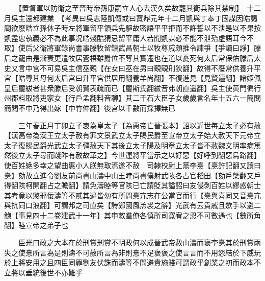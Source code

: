 　　【置督軍以防衛之至晉時帝孫康嗣立人心去漢久矣故罷其衛兵除其禁制】　十二月吳主還都建業　【考異曰吳志陸凱傳或曰寶鼎元年十二月凱與丁奉丁固謀因皓謁廟欲廢皓立孫休子時左將軍留平領兵先驅故密語平平拒而不許誓以不泄是以不果按凱盡忠執義必不為此事况皓殘酷猜忌留平庸人若聞凱謀必不能不泄殆虛語耳今不取】使后父衛將軍錄尚書事滕牧留鎮武昌朝士以牧尊戚頗推令諫爭【爭讀曰諍】滕后之寵由是漸衰更遣牧居蒼梧雖爵位不奪其實遷也在道以憂死何太后常保佑滕后太史又言中宮不可易吳主信巫覡【在女曰巫在男曰覡覡刑狄翻】故得不廢常供養升平宮【皓尊其母何太后宫曰升平宮供居用翻養羊尚翻】不復進見【見賢遍翻】諸姬佩皇后璽紱者甚衆滕后受朝賀表疏而已【璽斯氏翻紱音弗朝直遥翻】吳主使黄門徧行州郡料取將吏家女【行戶孟翻料音聊】其二千石大臣子女歲歲言名年十五六一簡閲簡閲不中乃得出嫁【中竹仲翻】後宫以千數而採擇無已

　　三年春正月丁卯立子衷為皇太子【為惠帝亡晉張本】詔以近世每立太子必有赦【漢高帝為漢王立太子赦有罪文景武立太子賜民爵至宣帝立太子始大赦天下元帝立太子復賜民爵光武立太子彊赦天下其後立太子陽及明章立太子皆不赦魏文明率病篤然後立太子尋而踐阼有赦故革之】今世運將平當示之以好惡【好呼到翻惡烏路翻】使百姓絶多幸之望曲惠小人朕無取焉遂不赦　司隸校尉上黨李憙【憙許記翻又讀曰憙】劾故立進令劉友前尚書山濤中山王睦尚書僕射武陔各占官稻田【劾戶槩翻又戶得翻陔柯開翻占之贍翻】請免濤睦等官陔已亡請貶其謚詔曰友侵剥百姓以繆惑朝士其考竟以懲邪佞濤等不貳其過皆勿有所問憙亢志在公當官而行【憙與喜同又音憙亢與抗同口浪翻】可謂邦之司直矣【詩鄭國風羔裘之辭】光武有云貴戚且歛手以避二鮑【事見四十二卷建武十一年】其申敕羣僚各慎所司寛宥之恩不可數遇也【數所角翻】睦宣帝之弟子也

　　臣光曰政之大本在於刑賞刑賞不明政何以成晉武帝赦山濤而褒李憙其於刑賞兩失之使憙所言為是則濤不可赦所言為非則憙不足褒褒之使言言而不用怨結於下威玩於上將安用之且四臣同罪劉友伏誅而濤等不問避貴施賤可謂政乎創業之初而政本不立將以垂統後世不亦難乎

